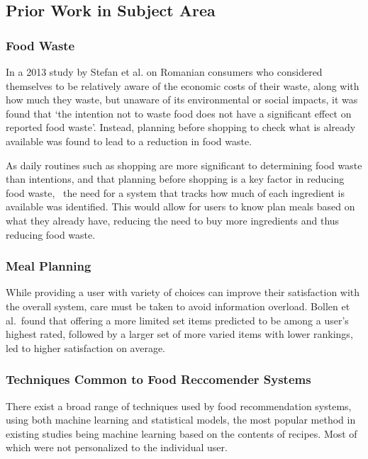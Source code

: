 \subsection{Prior Work in Subject Area}
\subsubsection{Food Waste}
In a 2013 study by Stefan et al. on Romanian consumers who considered themselves to be relatively aware of the economic
costs of their waste, along with how much they waste, but unaware of its environmental or social impacts, it was found that
\enquote*{the intention not to waste food does not have a significant effect on reported food waste}. Instead, planning
before shopping to check what is already available was found to lead to a reduction in food waste.~\cite{stefan_avoiding_2013}

As daily routines such as shopping are more significant to determining food waste than intentions, and that planning
before shopping is a key factor in reducing food waste,~\cite{stefan_avoiding_2013} the need for a system that tracks
how much of each ingredient is available was identified. This would allow for users to know plan meals based on what
they already have, reducing the need to buy more ingredients and thus reducing food waste.

\subsubsection{Meal Planning}
\label{sec:overload_intro}While providing a user with variety of choices can improve their satisfaction
with the overall system, care must be taken to avoid information overload.
Bollen et al.\ found that offering a more limited set items predicted to be among a user's
highest rated, followed by a larger set of more varied items with lower rankings, led to
higher satisfaction on average.~\cite{bollen_understanding_2010}

\subsubsection{Techniques Common to Food Reccomender Systems}
There exist a broad range of techniques used by food recommendation systems, using both machine learning
and statistical models, the most popular method in existing studies being machine learning based on the
contents of recipes. Most of which were not personalized to the individual user.~\cite{bondevik_systematic_2024}

